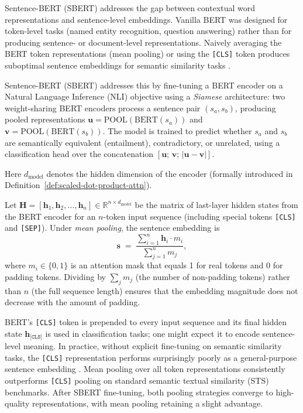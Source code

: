 \begin{deepdive}
Sentence-BERT (SBERT) addresses the gap between contextual word representations and sentence-level embeddings. Vanilla BERT was designed for token-level tasks (named entity
recognition, question answering) rather than for producing
sentence- or document-level representations.  Naively averaging the
BERT token representations (mean pooling) or using the \texttt{[CLS]}
token produces suboptimal sentence embeddings for semantic similarity
tasks \cite{reimers2019}. %

Sentence-BERT (SBERT) \cite{reimers2019} %
addresses this by fine-tuning a BERT encoder on a Natural Language
Inference (NLI) objective using a \emph{Siamese} architecture:
two weight-sharing BERT encoders process a sentence pair
$(s_a, s_b)$, producing pooled representations
$\mathbf{u} = \text{POOL}(\text{BERT}(s_a))$ and
$\mathbf{v} = \text{POOL}(\text{BERT}(s_b))$.
The model is trained to predict whether $s_a$ and $s_b$ are
semantically equivalent (entailment), contradictory, or unrelated,
using a classification head over the concatenation
$[\mathbf{u};\, \mathbf{v};\, |\mathbf{u} - \mathbf{v}|]$.

Here $d_{\mathrm{model}}$ denotes the hidden dimension of the encoder (formally introduced in Definition~\ref{def:scaled-dot-product-attn}).

\begin{definition}
\label{def:sbert-pool}
Let $\mathbf{H} = [\mathbf{h}_1, \mathbf{h}_2, \dots, \mathbf{h}_n]
\in \mathbb{R}^{n \times d_\text{model}}$
be the matrix of last-layer hidden states from the BERT encoder for an
$n$-token input sequence (including special tokens \texttt{[CLS]} and
\texttt{[SEP]}).  Under \emph{mean pooling}, the sentence embedding is
\begin{equation}
  \mathbf{s}
  \;=\;
  \frac{\displaystyle\sum_{i=1}^{n} \mathbf{h}_i \cdot m_i}
       {\displaystyle\sum_{j=1}^{n} m_j},
  \label{eq:sbert-mean-pool}
\end{equation}
where $m_i \in \{0, 1\}$ is an attention mask that equals 1 for real tokens
and 0 for padding tokens.  Dividing by $\sum_{j} m_j$ (the number of
non-padding tokens) rather than $n$ (the full sequence length) ensures that the
embedding magnitude does not decrease with the amount of padding.
\end{definition}

BERT's \texttt{[CLS]} token is prepended to every input sequence and
its final hidden state $\mathbf{h}_{\texttt{[CLS]}}$ is used in
classification tasks; one might expect it to encode sentence-level
meaning.  In practice, without explicit fine-tuning on semantic
similarity tasks, the \texttt{[CLS]} representation performs
surprisingly poorly as a general-purpose sentence embedding
\cite{reimers2019}. %
Mean pooling over all token representations consistently outperforms
\texttt{[CLS]} pooling on standard semantic textual similarity (STS)
benchmarks.  After SBERT fine-tuning, both pooling strategies converge
to high-quality representations, with mean pooling retaining a slight
advantage.


\end{deepdive}
